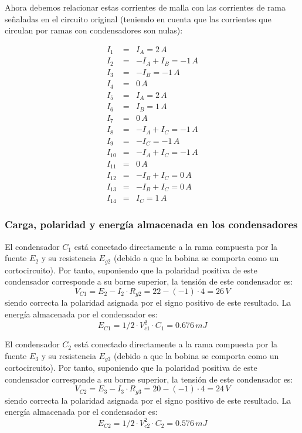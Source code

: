 \documentclass[10pt]{article}
\begin{document}
Ahora debemos relacionar estas corrientes de malla con las corrientes
de rama señaladas en el circuito original (teniendo en cuenta que
las corrientes que circulan por ramas con condensadores son nulas):

\begin{eqnarray*}
I_{1} & = & I_{A}=2\, A\\
I_{2} & = & -I_{A}+I_{B}=-1\, A\\
I_{3} & = & -I_{B}=-1\, A\\
I_{4} & = & 0\, A\\
I_{5} & = & I_{A}=2\, A\\
I_{6} & = & I_{B}=1\, A\\
I_{7} & = & 0\, A\\
I_{8} & = & -I_{A}+I_{C}=-1\, A\\
I_{9} & = & -I_{C}=-1\, A\\
I_{10} & = & -I_{A}+I_{C}=-1\, A\\
I_{11} & = & 0\, A\\
I_{12} & = & -I_{B}+I_{C}=0\, A\\
I_{13} & = & -I_{B}+I_{C}=0\, A\\
I_{14} & = & I_{C}=1\, A
\end{eqnarray*}



\subsubsection*{Carga, polaridad y energía almacenada en los condensadores}


El condensador $C_{1}$ está conectado directamente a la rama compuesta
por la fuente $E_{2}$ y su resistencia $E_{g2}$ (debido a que la
bobina se comporta como un cortocircuito). Por tanto, suponiendo que
la polaridad positiva de este condensador corresponde a su borne superior,
la tensión de este condensador es:
\[
V_{C1}=E_{2}-I_{2}\cdot R_{g2}=22-(-1)\cdot4=26\, V
\]
siendo correcta la polaridad asignada por el signo positivo de este
resultado. La energía almacenada por el condensador es:
\[
E_{C1}=1/2\cdot V_{c1}^{2}\cdot C_{1}=0.676\, mJ
\]

El condensador $C_{2}$ está conectado directamente a la rama compuesta
por la fuente $E_{3}$ y su resistencia $E_{g3}$ (debido a que la
bobina se comporta como un cortocircuito). Por tanto, suponiendo que
la polaridad positiva de este condensador corresponde a su borne superior,
la tensión de este condensador es:
\[
V_{C2}=E_{3}-I_{3}\cdot R_{g3}=20-(-1)\cdot4=24\, V
\]
siendo correcta la polaridad asignada por el signo positivo de este
resultado. La energía almacenada por el condensador es:
\[
E_{C2}=1/2\cdot V_{c2}^{2}\cdot C_{2}=0.576\, mJ
\]
\end{document}
